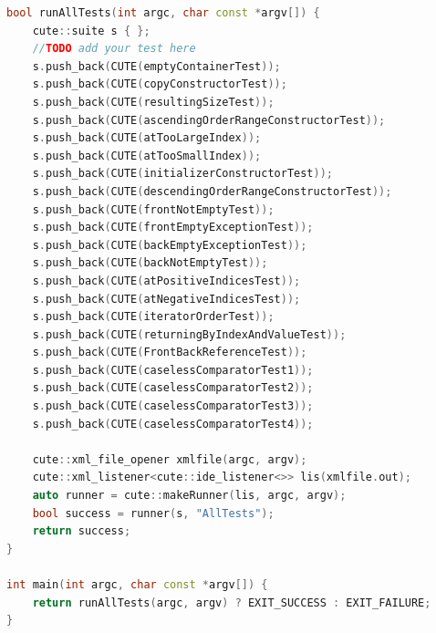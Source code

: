 \begin{lstlisting}[language=C++]
bool runAllTests(int argc, char const *argv[]) {
	cute::suite s { };
	//TODO add your test here
	s.push_back(CUTE(emptyContainerTest));
	s.push_back(CUTE(copyConstructorTest));
	s.push_back(CUTE(resultingSizeTest));
	s.push_back(CUTE(ascendingOrderRangeConstructorTest));
	s.push_back(CUTE(atTooLargeIndex));
	s.push_back(CUTE(atTooSmallIndex));
	s.push_back(CUTE(initializerConstructorTest));
	s.push_back(CUTE(descendingOrderRangeConstructorTest));
	s.push_back(CUTE(frontNotEmptyTest));
	s.push_back(CUTE(frontEmptyExceptionTest));
	s.push_back(CUTE(backEmptyExceptionTest));
	s.push_back(CUTE(backNotEmptyTest));
	s.push_back(CUTE(atPositiveIndicesTest));
	s.push_back(CUTE(atNegativeIndicesTest));
	s.push_back(CUTE(iteratorOrderTest));
	s.push_back(CUTE(returningByIndexAndValueTest));
	s.push_back(CUTE(FrontBackReferenceTest));
	s.push_back(CUTE(caselessComparatorTest1));
	s.push_back(CUTE(caselessComparatorTest2));
	s.push_back(CUTE(caselessComparatorTest3));
	s.push_back(CUTE(caselessComparatorTest4));

	cute::xml_file_opener xmlfile(argc, argv);
	cute::xml_listener<cute::ide_listener<>> lis(xmlfile.out);
	auto runner = cute::makeRunner(lis, argc, argv);
	bool success = runner(s, "AllTests");
	return success;
}

int main(int argc, char const *argv[]) {
	return runAllTests(argc, argv) ? EXIT_SUCCESS : EXIT_FAILURE;
}

\end{lstlisting}
